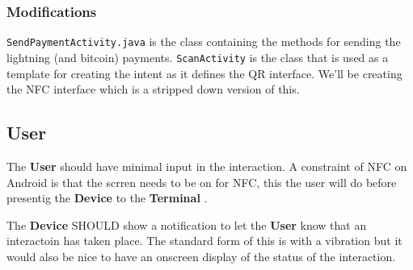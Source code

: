 \documentclass[a4paper]{article}
\newcommand{\terminal}{\textbf{\color{cornellred} Terminal }}
\newcommand{\device}{\textbf{ \color{airforceblue} Device }}
\newcommand{\user}{\textbf{\color{gray} User }}
\begin{document}
\subsubsection{Modifications}
\verb|SendPaymentActivity.java| is the class containing the methods for sending the
lightning (and bitcoin) payments.
\verb|ScanActivity| is the class that is used as a template for creating the intent as
it defines the QR interface.  We'll be creating the NFC interface which is a stripped
down version of this.

\subsection{\user}
The \user should have minimal input in the interaction.  A constraint of NFC on Android
is that the scrren needs to be on for NFC, this the user will do before presentig the
\device to the \terminal.

The \device SHOULD show a notification to let the \user know that an interactoin has
taken place.  The standard form of this is with a vibration but it would also be nice to
have an onscreen display of the status of the interaction.
\end{document}
